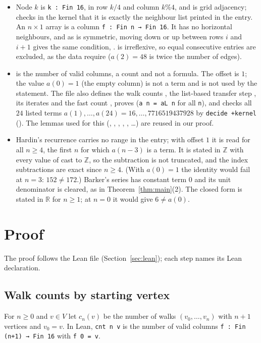 \documentclass[11pt]{amsart}
\theoremstyle{plain}
\theoremstyle{definition}
\newcommand{\Z}{\mathbb{Z}}
\newcommand{\R}{\mathbb{R}}
\begin{document}
\begin{itemize}
\item Node $k$ is \texttt{k : Fin 16}, in row $k/4$ and column $k\%4$, and  is grid adjacency;  checks in the kernel that it is exactly the neighbour list printed in the entry. An $n\times1$ array is a column \texttt{f : Fin n → Fin 16}. It has no horizontal neighbours, and as  is symmetric, moving down or up between rows $i$ and $i+1$ gives the same condition, .  is irreflexive, so equal consecutive entries are excluded, as the data require ($a(2)=48$ is twice the number of edges).
\item {} is the number of valid columns, a count and not a formula. The offset is $1$; the value $a(0)=1$ (the empty column) is not a term and is not used by the statement. The file also defines the walk counts , the list-based transfer step , its iterates  and the fast count , proves  (\texttt{a n = aL n} for all \texttt{n}), and checks all $24$ listed terms $a(1),\dots,a(24)=16,\dots,7716519437928$ by \texttt{decide +kernel} (). The lemmas used for this (, , , , , \dots) are reused in our proof.
\item Hardin's recurrence carries no range in the entry; with offset $1$ it is read for all $n\ge4$, the first $n$ for which $a(n-3)$ is a term. It is stated in $\Z$ with every value of  cast to $\Z$, so the subtraction is not truncated, and the index subtractions are exact since $n\ge4$. (With $a(0)=1$ the identity would fail at $n=3$: $152\ne172$.) Barker's series has constant term $0$ and its unit denominator is cleared, as in Theorem~\ref{thm:main}(2). The closed form is stated in $\R$ for $n\ge1$; at $n=0$ it would give $6\ne a(0)$.
\end{itemize}

\section{Proof}\label{sec:proof}

The proof follows the Lean file (Section~\ref{sec:lean}); each step names its Lean declaration.

\subsection{Walk counts by starting vertex}
For $n\ge0$ and $v\in V$ let $c_n(v)$ be the number of walks $(v_0,\dots,v_n)$ with $n+1$ vertices and $v_0=v$. In Lean, \texttt{cnt n v} is the number of valid columns \mbox{\texttt{f : Fin (n+1) → Fin 16}} with \texttt{f 0 = v}.
\end{document}
